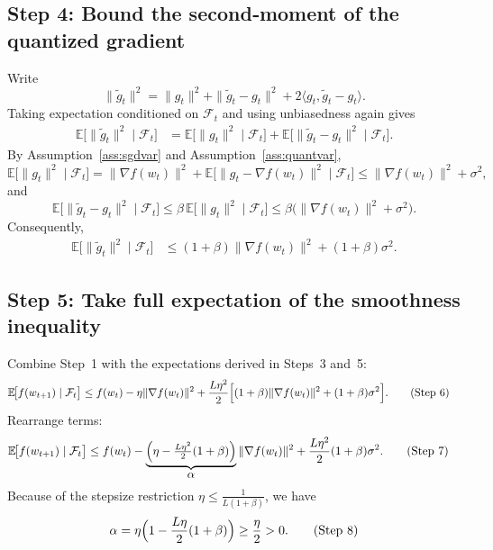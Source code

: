 \documentclass{article}
\newcommand{\E}{\mathbb{E}}
\begin{document}
\subsection*{Step 4: Bound the second‑moment of the quantized gradient}
Write
\[
    \|\tilde g_t\|^2 = \|g_t\|^2 + \| \tilde g_t-g_t\|^2
                      +2\langle g_t,\tilde g_t-g_t\rangle .
\]
Taking expectation conditioned on $\mathcal{F}_t$ and using unbiasedness again gives
\begin{align}
    \E\!\bigl[\|\tilde g_t\|^2\mid\mathcal{F}_t\bigr]
    &= \E\!\bigl[\|g_t\|^2\mid\mathcal{F}_t\bigr]
       +\E\!\bigl[\|\tilde g_t-g_t\|^2\mid\mathcal{F}_t\bigr] .
    \tag{Step 4}
\end{align}
By Assumption~\ref{ass:sgdvar} and Assumption~\ref{ass:quantvar},
\[
    \E\!\bigl[\|g_t\|^2\mid\mathcal{F}_t\bigr]
    = \|\nabla f(w_t)\|^2 + \E\!\bigl[\|g_t-\nabla f(w_t)\|^2\mid\mathcal{F}_t\bigr]
    \le \|\nabla f(w_t)\|^2 + \sigma^2 ,
\]
and
\[
    \E\!\bigl[\|\tilde g_t-g_t\|^2\mid\mathcal{F}_t\bigr]
    \le \beta\,\E\!\bigl[\|g_t\|^2\mid\mathcal{F}_t\bigr]
    \le \beta\bigl(\|\nabla f(w_t)\|^2+\sigma^2\bigr) .
\]
Consequently,
\begin{align}
    \E\!\bigl[\|\tilde g_t\|^2\mid\mathcal{F}_t\bigr]
    &\le (1+\beta)\|\nabla f(w_t)\|^2 + (1+\beta)\sigma^2 .
    \tag{Step 5}
\end{align}

\subsection*{Step 5: Take full expectation of the smoothness inequality}
Combine Step~1 with the expectations derived in Steps~3 and~5:
\begin{align}
    \E\!\bigl[f(w_{t+1})\mid\mathcal{F}_t\bigr]
    &\le f(w_t) -\eta\|\nabla f(w_t)\|^2
       +\frac{L\eta^2}{2}\Bigl[(1+\beta)\|\nabla f(w_t)\|^2
                               +(1+\beta)\sigma^2\Bigr] .
    \tag{Step 6}
\end{align}
Rearrange terms:
\begin{align}
    \E\!\bigl[f(w_{t+1})\mid\mathcal{F}_t\bigr]
    &\le f(w_t)
       -\underbrace{\Bigl(\eta-\tfrac{L\eta^2}{2}(1+\beta)\Bigr)}_{\displaystyle\alpha}
         \|\nabla f(w_t)\|^2
       +\frac{L\eta^2}{2}(1+\beta)\sigma^2 .
    \tag{Step 7}
\end{align}
Because of the stepsize restriction $\eta\le\frac{1}{L(1+\beta)}$, we have
\[
    \alpha = \eta\Bigl(1-\frac{L\eta}{2}(1+\beta)\Bigr)\ge\frac{\eta}{2}>0 .
\tag{Step 8}
\]
\end{document}
